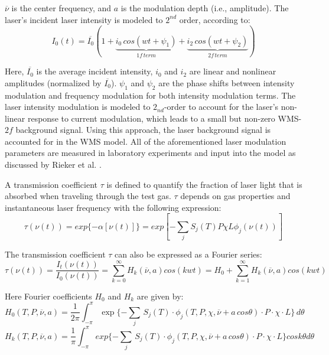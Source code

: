 \noindent $\overline{\nu}$ is the center frequency, and $a$ is the modulation depth (i.e., amplitude). The laser's incident laser intensity is modeled to $2^{nd}$ order, according to: 
\begin{equation}\label{eq:ch3_3}
I_0(t)=\overline{I_0}(1+\underbrace{i_0\,cos(wt+\psi_1)}_{1f\,term}+\underbrace{i_2\,cos(wt+\psi_2)}_{2f\,term})
\end{equation}

\noindent Here, $\overline{I_0}$ is the average incident intensity, $i_0$ and $i_2$ are linear and nonlinear amplitudes (normalized by $\overline{I_0}$). $\psi_1$ and $\psi_2$ are the phase shifts between intensity modulation and frequency modulation for both intensity modulation terms. The laser intensity modulation is modeled to $2_{nd}$-order to account for the laser's non-linear response to current modulation, which leads to a small but non-zero WMS-$2f$ background signal. Using this approach, the laser background signal is accounted for in the WMS model. All of the aforementioned laser modulation parameters are measured in laboratory experiments and input into the model as discussed by Rieker et al. \cite{rieker2009calibration}.

A transmission coefficient $\tau$ is defined to quantify the fraction of laser light that is absorbed when traveling through the test gas. $\tau$ depends on gas properties and instantaneous laser frequency with the following expression:
\begin{equation}
\tau(\nu(t))=exp\{-\alpha[\nu(t)]\}=exp[-\sum_{j}S_j(T)P\chi L\phi_j(\nu(t))]
\end{equation}

The transmission coefficient $\tau$ can also be expressed as a Fourier series:
\begin{equation}
\tau(\nu(t))=\frac{I_t(\nu(t))}{I_0(\nu(t))}=\sum_{k=0}^{\infty}H_k(\overline{\nu},a)cos(kwt)=H_0+\sum_{k=1}^{\infty}H_k(\overline{\nu},a)cos(kwt)
\end{equation}

\noindent Here Fourier coefficients $H_0$ and $H_k$ are given by:
\begin{equation}
H_0(T,P,\overline{\nu},a)=\frac{1}{2\pi}\int_{-\pi}^{\pi}\exp\{-\sum_j\,S_j(T) \cdot \phi_j(T,P,\chi,\overline{\nu}+a\,cos\theta) \cdot P \cdot \chi \cdot L\}\,d\theta
\end{equation}
\begin{equation}
H_k(T,P,\overline{\nu},a)=\frac{1}{\pi}\int_{-\pi}^{\pi}exp\{-\sum_j\,S_j(T) \cdot \phi_j(T,P,\chi,\overline{\nu}+a\,cos\theta) \cdot P \cdot \chi \cdot L\}cos k\theta d\theta
\end{equation}

